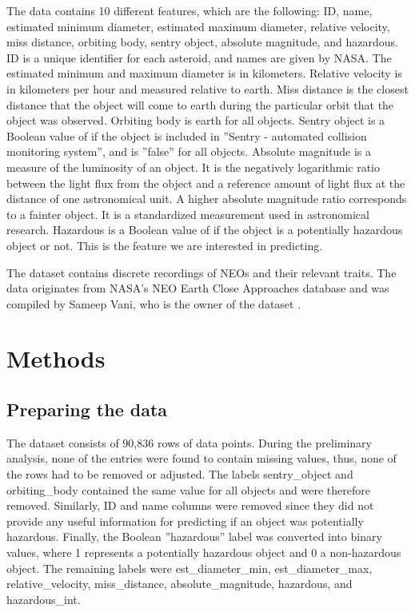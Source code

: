 \documentclass{article}
\begin{document}
The data contains 10 different features, which are the following: ID, name, estimated minimum diameter, estimated maximum diameter, relative velocity, miss distance, orbiting body, sentry object, absolute magnitude, and hazardous. ID is a unique identifier for each asteroid, and names are given by NASA. The estimated minimum and maximum diameter is in kilometers. Relative velocity is in kilometers per hour and measured relative to earth. Miss distance is the closest distance that the object will come to earth during the particular orbit that the object was observed. Orbiting body is earth for all objects. Sentry object is a Boolean value of if the object is included in ''Sentry - automated collision monitoring system'', and is ''false'' for all objects. Absolute magnitude is a measure of the luminosity of an object. It is the negatively logarithmic ratio between the light flux from the object and a reference amount of light flux at the distance of one astronomical unit. A higher absolute magnitude ratio corresponds to a fainter object. It is a standardized measurement used in astronomical research. Hazardous is a Boolean value of if the object is a potentially hazardous object or not. This is the feature we are interested in predicting. 


\vspace{1em}

The dataset contains discrete recordings of NEOs and their relevant traits. The data originates from NASA's NEO Earth Close Approaches database and was compiled by Sameep Vani, who is the owner of the dataset \cite{Kaggle_neo_data}.










\section{Methods}
\subsection{Preparing the data}


The dataset consists of 90,836 rows of data points. During the preliminary analysis, none of the entries were found to contain missing values, thus, none of the rows had to be removed or adjusted. The labels sentry\_object and orbiting\_body contained the same value for all objects and were therefore removed. Similarly, ID and name columns were removed since they did not provide any useful information for predicting if an object was potentially hazardous. Finally, the Boolean ''hazardous'' label was converted into binary values, where 1 represents a potentially hazardous object and 0 a non-hazardous object. The remaining labels were est\_diameter\_min, est\_diameter\_max, relative\_velocity, miss\_distance, absolute\_magnitude, hazardous, and hazardous\_int.
\end{document}

